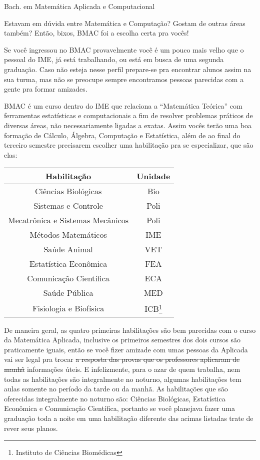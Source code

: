\begin{subsecao}{Bach. em Matemática Aplicada e Computacional}

Estavam em dúvida entre Matemática e Computação? Gostam de outras áreas também?
Então, bixos, BMAC foi a escolha certa pra vocês!

Se você ingressou no BMAC provavelmente você é um pouco mais velho que o pessoal
do IME, já está trabalhando, ou está em busca de uma segunda graduação. Caso não
esteja nesse perfil prepare-se pra encontrar alunos assim na sua turma, mas não
se preocupe sempre encontramos pessoas parecidas com a gente pra formar
amizades.

BMAC é um curso dentro do IME que relaciona a ``Matemática Teórica'' com
ferramentas estatísticas e computacionais a fim de resolver problemas práticos
de diversas áreas, não necessariamente ligadas a exatas. Assim vocês terão uma
boa formação de Cálculo, Álgebra, Computação e Estatística, além de ao final do
terceiro semestre precisarem escolher uma habilitação pra se especializar, que
são elas:

\begin {center}
  \begin {tabular}{|c|c|}
    \hline
    Habilitação & Unidade \\
    \hline
    Ciências Biológicas & Bio\\
    Sistemas e Controle & Poli\\
    Mecatrônica e Sistemas Mecânicos & Poli\\
    Métodos Matemáticos & IME\\
    Saúde Animal & VET \\
    Estatística Econômica & FEA \\
    Comunicação Científica & ECA \\
    Saúde Pública & MED \\
    Fisiologia e Biofísica & ICB\footnote{Instituto de Ciências Biomédicas} \\
    \hline
  \end {tabular}
\end {center}

De maneira geral, as quatro primeiras habilitações são bem parecidas com o
curso da Matemática Aplicada, inclusive os primeiros semestres dos dois cursos
são praticamente iguais, então se você fizer amizade com umas pessoas da
Aplicada vai ser legal pra trocar \sout{a resposta das provas que os
professores aplicaram de manhã} informações úteis. E infelizmente, para o azar
de quem trabalha, nem todas as habilitações são integralmente no noturno,
algumas habilitações tem aulas somente no período da tarde ou da manhã. As
habilitações que são oferecidas integralmente no noturno são: Ciências
Biológicas, Estatística Econômica e Comunicação Científica, portanto se você
planejava fazer uma graduação toda a noite em uma habilitação diferente das
acimas listadas trate de rever seus planos.


\end{subsecao}

